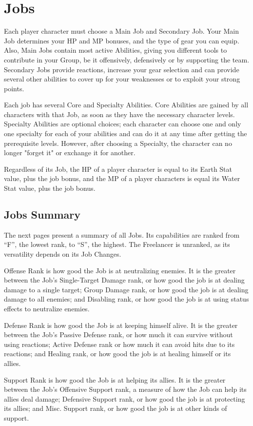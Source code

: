 \section{Jobs}
\begin{multicols}{2}
Each player character must choose a Main
Job and Secondary Job. Your Main Job determines
your HP and MP bonuses, and the type of gear you
can equip. Also, Main Jobs contain most active
Abilities, giving you different tools to contribute in
your Group, be it offensively, defensively or by
supporting the team. Secondary Jobs provide
reactions, increase your gear selection and can
provide several other abilities to cover up for your
weaknesses or to exploit your strong points.

Each job has several Core and Specialty
Abilities. Core Abilities are gained by all characters
with that Job, as soon as they have the necessary
character levels. Specialty Abilities are optional
choices; each character can choose one and only
one specialty for each of your abilities and can do
it at any time after getting the prerequisite levels.
However, after choosing a Specialty, the character
can no longer "forget it" or exchange it for another.

Regardless of its Job, the HP of a player
character is equal to its Earth Stat value, plus the\FloatBarrier
job bonus, and the MP of a player characters is
equal its Water Stat value, plus the job bonus.

\subsection{Jobs Summary}
The next pages present a summary of all
Jobs. Its capabilities are ranked from “F”, the
lowest rank, to “S”, the highest. The Freelancer is
unranked, as its versatility depends on its Job
Changes.

Offense Rank is how good the Job is at
neutralizing enemies. It is the greater between the
Job's Single-Target Damage rank, or how good the
job is at dealing damage to a single target; Group
Damage rank, or how good the job is at dealing
damage to all enemies; and Disabling rank, or how
good the job is at using status effects to neutralize
enemies.

Defense Rank is how good the Job is at
keeping himself alive. It is the greater between the
Job's Passive Defense rank, or how much it can
survive without using reactions; Active Defense
rank or how much it can avoid hits due to its
reactions; and Healing rank, or how good the job is
at healing himself or its allies.

Support Rank is how good the Job is at
helping its allies. It is the greater between the Job's
Offensive Support rank, a measure of how the Job
can help its allies deal damage; Defensive Support
rank, or how good the job is at protecting its allies;
and Misc. Support rank, or how good the job is at
other kinds of support.
\end{multicols}

